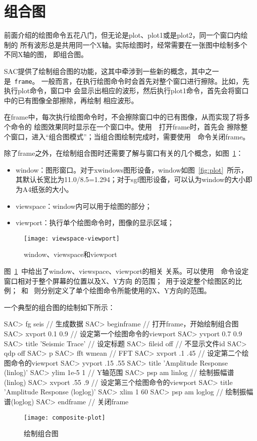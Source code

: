 \section{组合图}
\label{sec:composite-plots}

前面介绍的绘图命令五花八门，但无论是plot、plot1或是plot2，同一个窗口内绘制的
所有波形总是共用同一个X轴。实际绘图时，经常需要在一张图中绘制多个不同X轴的图，
即组合图。

SAC提供了绘制组合图的功能，这其中牵涉到一些新的概念，其中之一是~\verb+frame+。
一般而言，在执行绘图命令时会首先对整个窗口进行擦除。比如，先执行plot命令，窗口中
会显示出相应的波形，然后执行plot1命令，首先会将窗口中的已有图像全部擦除，再绘制
相应波形。

在frame中，每次执行绘图命令时，不会擦除窗口中的已有图像，从而实现了将多个命令的
绘图效果同时显示在一个窗口中。使用~~打开frame时，首先会
擦除整个窗口，进入``组合图模式''；当组合图绘制完成时，需要使用~~命令关闭frame。

除了frame之外，在绘制组合图时还需要了解与窗口有关的几个概念，如图~\ref{fig:window-viewspace-viewport}：
\begin{itemize}
\item window：图形窗口。对于xwindows图形设备，window如图~\ref{fig:plot}~所示，
    其默认长宽比为11.0/8.5=1.294；对于sgf图形设备，可以认为window的大小即为A4纸张的大小。
\item viewspace：window内可以用于绘图的部分；
\item viewport：执行单个绘图命令时，图像的显示区域；
\end{itemize}

\begin{figure}[H]
\centering
\texttt{[image: viewspace-viewport]}
\caption{window、viewspace和viewport}
\label{fig:window-viewspace-viewport}
\end{figure}

图~\ref{fig:window-viewspace-viewport}~中给出了window、viewspace、viewport的相关
关系。可以使用~~命令设定窗口相对于整个屏幕的位置以及X、Y方向
的范围；~用于设定整个绘图区的比例；~和
~则分别定义了单个绘图命令所能使用的X、Y方向的范围。

一个典型的组合图的绘制如下所示：
\begin{SACCode}
SAC> fg seis                        // 生成数据
SAC> beginframe                     // 打开frame，开始绘制组合图
SAC> xvport 0.1 0.9                 // 设定第一个绘图命令的viewport
SAC> yvport 0.7 0.9
SAC> title 'Seismic Trace'          // 设定标题
SAC> fileid off                     // 不显示文件id
SAC> qdp off
SAC> p
SAC> fft wmean                      // FFT
SAC> xvport .1 .45                  // 设定第二个绘图命令的viewport
SAC> yvport .15 .55
SAC> title 'Amplitude Response (linlog)'
SAC> ylim 1e-5 1                    // Y轴范围
SAC> psp am linlog                  // 绘制振幅谱(linlog)
SAC> xvport .55 .9                  // 设定第三个绘图命令的viewport
SAC> title 'Amplitude Response (loglog)'
SAC> xlim 1 60
SAC> psp am loglog                  // 绘制振幅谱(loglog)
SAC> endframe                       // 关闭frame
\end{SACCode}

\begin{figure}[H]
\centering
\texttt{[image: composite-plot]}
\caption{绘制组合图}
\label{fig:composite-plot}
\end{figure}
